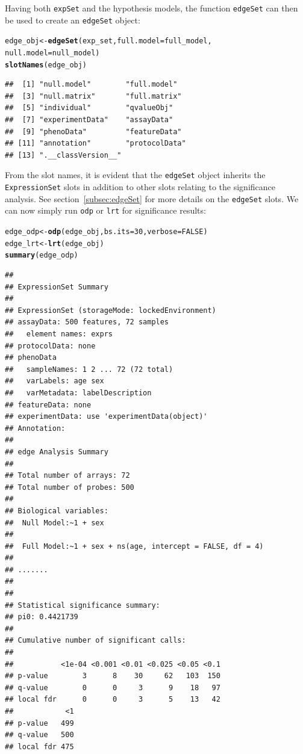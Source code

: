 \documentclass{article}\usepackage[]{graphicx}\usepackage[]{color}
\makeatletter
\newcommand{\hlnum}[1]{\textcolor[rgb]{0.686,0.059,0.569}{#1}}%
\newcommand{\hlstd}[1]{\textcolor[rgb]{0.345,0.345,0.345}{#1}}%
\newcommand{\hlkwb}[1]{\textcolor[rgb]{0.69,0.353,0.396}{#1}}%
\newcommand{\hlkwc}[1]{\textcolor[rgb]{0.333,0.667,0.333}{#1}}%
\newcommand{\hlkwd}[1]{\textcolor[rgb]{0.737,0.353,0.396}{\textbf{#1}}}%
\newenvironment{kframe}{%
 \def\at@end@of@kframe{}%
 \ifinner\ifhmode%
  \def\at@end@of@kframe{\end{minipage}}%
  \begin{minipage}{\columnwidth}%
 \fi\fi%
 \def\FrameCommand##1{\hskip\@totalleftmargin \hskip-\fboxsep
 \colorbox{shadecolor}{##1}\hskip-\fboxsep
     \hskip-\linewidth \hskip-\@totalleftmargin \hskip\columnwidth}%
 \MakeFramed {\advance\hsize-\width
   \@totalleftmargin\z@ \linewidth\hsize
   \@setminipage}}%
 {\par\unskip\endMakeFramed%
 \at@end@of@kframe}
\newenvironment{knitrout}{}{} %
\makeatother
\begin{document}
Having both {\tt expSet} and the hypothesis models, the function {\tt edgeSet} can then be used to create an {\tt edgeSet} object:
\begin{knitrout}
\color{fgcolor}\begin{kframe}
\begin{alltt}
\hlstd{edge_obj} \hlkwb{<-} \hlkwd{edgeSet}\hlstd{(exp_set,} \hlkwc{full.model} \hlstd{= full_model,}
    \hlkwc{null.model} \hlstd{= null_model)}
\hlkwd{slotNames}\hlstd{(edge_obj)}
\end{alltt}
\begin{verbatim}
##  [1] "null.model"        "full.model"       
##  [3] "null.matrix"       "full.matrix"      
##  [5] "individual"        "qvalueObj"        
##  [7] "experimentData"    "assayData"        
##  [9] "phenoData"         "featureData"      
## [11] "annotation"        "protocolData"     
## [13] ".__classVersion__"
\end{verbatim}
\end{kframe}
\end{knitrout}

From the slot names, it is evident that the {\tt edgeSet} object inherits the {\tt ExpressionSet} slots in addition to other slots relating to the significance analysis. See section~\ref{subsec:edgeSet} for more details on the {\tt edgeSet} slots. We can now simply run {\tt odp} or {\tt lrt} for significance results:
\begin{knitrout}
\color{fgcolor}\begin{kframe}
\begin{alltt}
\hlstd{edge_odp} \hlkwb{<-} \hlkwd{odp}\hlstd{(edge_obj,} \hlkwc{bs.its} \hlstd{=} \hlnum{30}\hlstd{,} \hlkwc{verbose} \hlstd{=} \hlnum{FALSE}\hlstd{)}
\hlstd{edge_lrt} \hlkwb{<-} \hlkwd{lrt}\hlstd{(edge_obj)}
\hlkwd{summary}\hlstd{(edge_odp)}
\end{alltt}
\begin{verbatim}
## 
## ExpressionSet Summary 
##  
## ExpressionSet (storageMode: lockedEnvironment)
## assayData: 500 features, 72 samples 
##   element names: exprs 
## protocolData: none
## phenoData
##   sampleNames: 1 2 ... 72 (72 total)
##   varLabels: age sex
##   varMetadata: labelDescription
## featureData: none
## experimentData: use 'experimentData(object)'
## Annotation:  
## 
## edge Analysis Summary 
##  
## Total number of arrays: 72 
## Total number of probes: 500 
##  
## Biological variables: 
## 	Null Model:~1 + sex
## 
## 	Full Model:~1 + sex + ns(age, intercept = FALSE, df = 4)
## 
## ....... 
##  
## 
## Statistical significance summary:
## pi0:	0.4421739	
## 
## Cumulative number of significant calls:
## 
##           <1e-04 <0.001 <0.01 <0.025 <0.05 <0.1
## p-value        3      8    30     62   103  150
## q-value        0      0     3      9    18   97
## local fdr      0      0     3      5    13   42
##            <1
## p-value   499
## q-value   500
## local fdr 475
\end{verbatim}
\end{kframe}
\end{knitrout}
\end{document}
